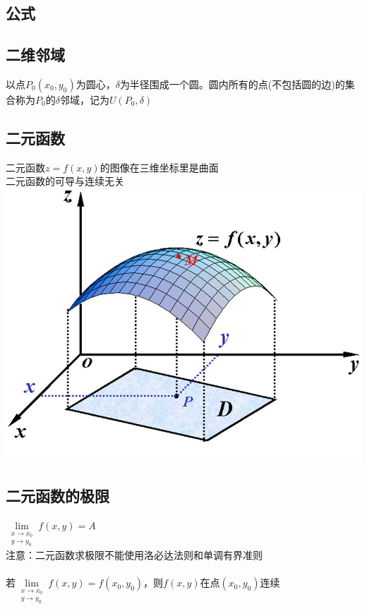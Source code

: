 \documentclass{article}
\begin{document}
\begin{flushleft}
	\LARGE
	
	\section{公式}

	\subsection{二维邻域}
	以点$P_0(x_0,y_0)$为圆心，$\delta$为半径围成一个圆。圆内所有的点(不包括圆的边)的集合称为$P_0$的$\delta$邻域，记为$U(P_0,\delta)$\\
	
	\subsection{二元函数}
	二元函数$z=f(x,y)$的图像在三维坐标里是曲面\\
	二元函数的可导与连续无关\\
	\includegraphics[scale=0.5]{eyhstx.jpg}
	
	\subsection{二元函数的极限}
	$\lim\limits_{\substack{x\to x_0\\ y\to y_0}}f(x,y)=A$\\
	注意：二元函数求极限不能使用洛必达法则和单调有界准则\\
	~\\
	若$\lim\limits_{\substack{x\to x_0\\ y\to y_0}}f(x,y)=f(x_0,y_0)$，则$f(x,y)$在点$(x_0,y_0)$连续\\
	

\end{flushleft}
\end{document}
